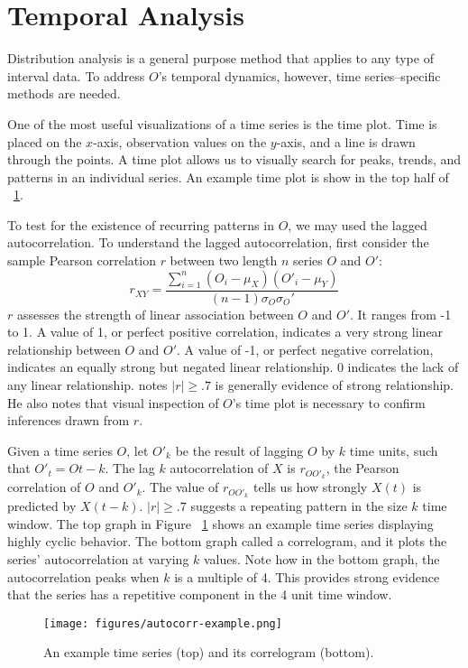 \section{Temporal Analysis}
Distribution analysis is a general purpose method that applies to any type of interval data. To address $O$'s temporal dynamics, however, time series--specific methods are needed.

One of the most useful visualizations of a time series is the time plot. Time is placed on the $x$-axis, observation values on the $y$-axis, and a line is drawn through the points. A time plot allows us to visually search for peaks, trends, and patterns in an individual series. An example time plot is show in the top half of ~\ref{fig:autocorrex}.

To test for the existence of recurring patterns in $O$, we may used the lagged autocorrelation. To understand the lagged autocorrelation, first consider the sample Pearson correlation $r$ between two length $n$ series $O$ and $O'$:
\[r_{XY} = \frac{\sum\limits_{i=1}^{n}(O_i-\mu_X)(O'_i-\mu_Y)}
		   {(n-1)\sigma_O\sigma_O'}\]
$r$ assesses the strength of linear association between $O$ and $O'$. It ranges from -1 to 1. A value of 1, or perfect positive correlation, indicates a very strong linear relationship between $O$ and $O'$. A value of -1, or perfect negative correlation, indicates an equally strong but negated linear relationship. 0 indicates the lack of any linear relationship. \citet{cohen} notes $|r| \geq .7$ is generally evidence of strong relationship. He also notes that visual inspection of $O$'s time plot is necessary to confirm inferences drawn from $r$.

Given a time series $O$, let $O'_k$ be the result of lagging $O$ by $k$ time units, such that $O'_t = O{t-k}$. The lag $k$ autocorrelation of $X$ is $r_{OO'_k}$, the Pearson correlation of $O$ and $O'_k$. The value of $r_{OO'_k}$ tells us how strongly $X(t)$ is predicted by $X(t-k)$. $|r| \geq .7$ suggests a repeating pattern in the size $k$ time window. The top graph in Figure ~\ref{fig:autocorrex} shows an example time series displaying highly cyclic behavior. The bottom graph called a correlogram, and it plots the series' autocorrelation at varying $k$ values. Note how in the bottom graph, the autocorrelation peaks when $k$ is a multiple of 4. This provides strong evidence that the series has a repetitive component in the 4 unit time window.
\begin{figure}
	\centerline{\texttt{[image: figures/autocorr-example.png]}}
	\caption{An example time series (top) and its correlogram (bottom).}
	\label{fig:autocorrex}
\end{figure}
